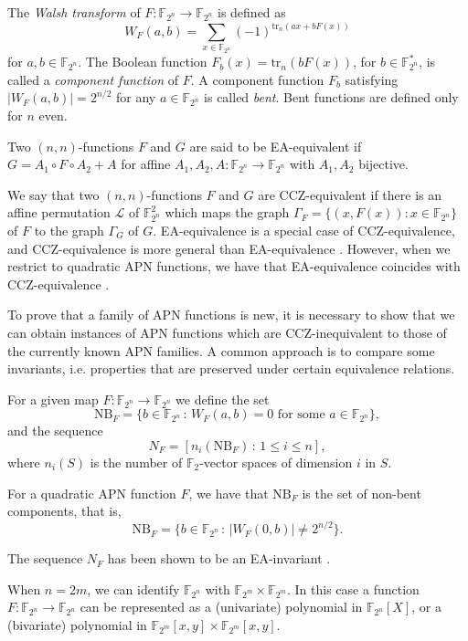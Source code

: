 \documentclass{article}
\newcommand{\tr}{\mathrm{tr}}
\begin{document}
The \textit{Walsh transform} of $F : \mathbb{F}_{2^n} \rightarrow \mathbb{F}_{2^n}$ is defined as $$W_F(a,b) = \sum_{x \in \mathbb{F}_{2^n}} (-1)^{ \tr_n(a x+bF(x))}$$ for $a,b \in \mathbb{F}_{2^n}$. The Boolean function $ F_b(x)= \tr_n(b F(x))$, for $b\in \mathbb{F}_{2^n}^*$, is called a {\em component function} of $F$. 
A component function $F_b$ satisfying $|W_F(a,b)|=2^{n/2}$ for any $a\in\mathbb{F}_{2^n}$ is called \textit{bent}. Bent functions are defined only for $n$ even.


Two $(n,n)$-functions $F$ and $G$ are said to be EA-equivalent if $G = A_1 \circ F \circ A_2 + A$ for affine $A_1, A_2, A : \mathbb{F}_{2^n} \rightarrow \mathbb{F}_{2^n}$ with $A_1, A_2$ bijective. 

We say that two $(n,n)$-functions $F$ and $G$ are CCZ-equivalent if there is an affine permutation $\mathcal{L}$ of $\mathbb{F}_{2^n}^2$ which maps the graph $\Gamma_F = \{ (x,F(x)) : x \in \mathbb{F}_{2^n} \}$ of $F$ to the graph $\Gamma_G$ of $G$. EA-equivalence is a special case of CCZ-equivalence, and CCZ-equivalence is more general than EA-equivalence \cite{BCP}. However, when we restrict to quadratic APN functions, we have that EA-equivalence coincides with CCZ-equivalence \cite{ccz-ea}. 

To prove that a family of APN functions is new, it is necessary to show that we can obtain instances of APN functions which are CCZ-inequivalent to those of the currently known APN families. A common approach is to compare some invariants, i.e. properties that are preserved under certain equivalence relations.

For a given map $F : \mathbb{F}_{2^n} \rightarrow \mathbb{F}_{2^n}$ we define the set
$$
\mathrm{NB}_F=\{b\in\mathbb{F}_{2^n}\,:\,W_F(a,b)=0 \text{ for some } a\in\mathbb{F}_{2^n}\},
$$
and the sequence
$$
N_F=[n_i(\mathrm{NB}_F)\,:\, 1\le i\le n ],
$$
where $n_i(S)$ is the number of $\mathbb{F}_2$-vector spaces of dimension $i$ in $S$.

For a quadratic APN function $F$, we have that $\mathrm{NB}_F$ is the set of non-bent components, that is,
$$
\mathrm{NB}_F=\{b\in\mathbb{F}_{2^n}\,:\,|W_F(0,b)|\ne 2^{n/2}\}.
$$

The sequence $N_F$ has been shown to be an EA-invariant \cite{seta18-1,golpav}.


When $n=2m$, we can identify $\mathbb{F}_{2^n}$ with $\mathbb{F}_{2^m}\times \mathbb{F}_{2^m}$. In this case a function
$F : \mathbb{F}_{2^n} \rightarrow \mathbb{F}_{2^n}$
can be represented as a (univariate) polynomial in  $\mathbb{F}_{2^n}[X]$, or a (bivariate) polynomial in $\mathbb{F}_{2^m}[x,y]\times \mathbb{F}_{2^m}[x,y]$. 
\end{document}

